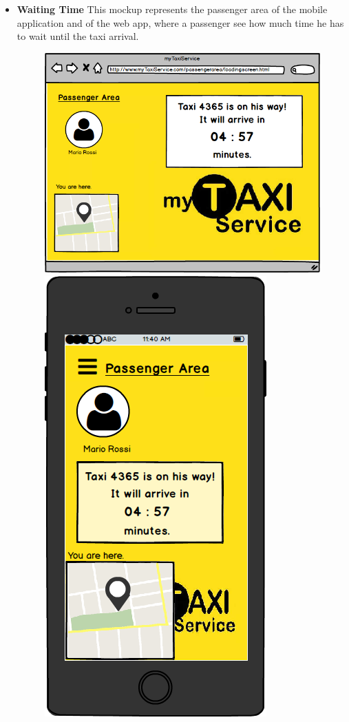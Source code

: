 \documentclass[18pt,oneside,a4paper, titlepage]{article}
\begin{document}
\begin{itemize}
\begin{figure}[h]
				\end{figure}
				\\ \\ 
				\item \textbf{Waiting Time} This mockup represents the passenger area of the mobile application and of the web app, where a passenger see how much time he has to wait until the taxi arrival.\\
				\begin{figure}[h]
					\includegraphics[scale=0.3]{WebAppTaxiIsArriving.png}%
					\qquad\qquad
					\includegraphics[scale=0.3]{MobileAppTaxiIsArriving.png}

\end{figure}
\end{itemize}
\end{document}
